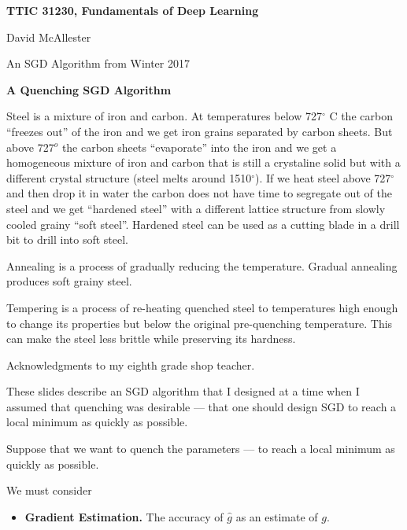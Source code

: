 


\newcommand{\solution}[1]{\bigskip {\bf Solution}: #1}



{\Huge
  \centerline{\bf TTIC 31230, Fundamentals of Deep Learning}
  \bigskip
  \centerline{David McAllester}
  \centerline{An SGD Algorithm from Winter 2017}
  \vfill
  \centerline{\bf A Quenching SGD Algorithm}
  \vfill


Steel is a mixture of iron and carbon. At temperatures below 727$^\circ$ C the carbon ``freezes out'' of the iron and we get iron grains separated
by carbon sheets.  But above 727$^o$ the carbon sheets ``evaporate'' into the iron and we get a homogeneous mixture of iron and carbon that is still a crystaline solid
but with a different crystal structure (steel melts around 1510$^\circ$).  If we heat steel above 727$^\circ$ and then drop it in water the carbon does not have time
to segregate out of the steel and we get ``hardened steel'' with a different lattice structure from slowly cooled grainy ``soft steel''.
Hardened steel can be used as a cutting blade in a drill bit to drill into soft steel.


Annealing is a process of gradually reducing the temperature.  Gradual annealing produces soft grainy steel.

\vfill
Tempering is a process of re-heating quenched steel to temperatures high enough to change its properties but below the original pre-quenching temperature.
This can make the steel less brittle while preserving its hardness.

\vfill
Acknowledgments to my eighth grade shop teacher.


These slides describe an SGD algorithm that I designed at a time when I assumed that quenching was desirable --- that one should design SGD to reach a local minimum as quickly as possible.


Suppose that we want to quench the parameters --- to reach a local minimum as quickly as possible.

\vfill
We must consider

\vfill
\begin{itemize}
\item {\bf Gradient Estimation.} The accuracy of $\hat{g}$ as an estimate of $g$.


\end{itemize}}
